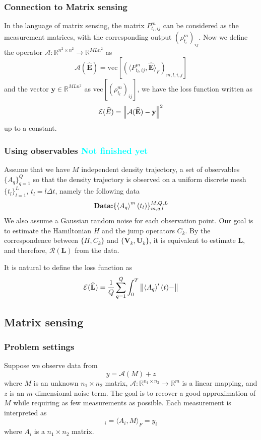\documentclass[10pt]{article}  %
\theoremstyle{plain}
\numberwithin{equation}{section}
\newcommand{\innerp}[1]{\langle{#1}\rangle}
\def\mE{\mathcal{E}}
\def\mA{\mathcal{A}}
\def\mR{\mathcal{R}}
\def\R{\mathbb{R}}
\newcommand{\bL}{\mathbf{L}}
\newcommand{\bV}{\mathbf{V}}
\newcommand{\bU}{\mathbf{U}}
\newcommand{\bE}{\mathbf{E}}
\newcommand{\by}{\mathbf{y}}
\renewcommand{\vec}{\text{vec}}
\newcommand{\QL}[1]{\textcolor{cyan}{{#1}}}
\begin{document}
\subsubsection{Connection to Matrix sensing}
In the language of matrix sensing, the matrix $P^m_{t_l, ij}$ can be considered as the measurement matrices, with the corresponding output $(\rho^m_{t_l})_{ij}$. Now we define the operator $\mA : \R^{n^2\times n^2}\to \R^{MLn^2}$ as
\begin{equation}
	\mA(\widehat{\bE}) = \vec\left[(\innerp{P^m_{t_l, ij}, \widehat{\bE}}_F)_{m, l, i, j}\right]
\end{equation}
and the vector $\by\in \R^{MLn^2}$ as $\vec\left[(\rho^m_{t_l})_{ij}\right]$, we have the loss function written as 
\begin{equation}
	\mE(\widehat{E}) = \norm{\mA(\widehat{\bE}) - \by}^2
\end{equation}
up to a constant. 

\subsubsection{Using observables \QL{Not finished yet}}
Assume that we have $M$ independent density trajectory, a set of observables $\{A_q\}_{q = 1}^Q$ so that the density trajectory is observed on a uniform discrete mesh $\{t_l\}_{l = 1}^L$, $t_l = l \Delta t$, namely the following data
\begin{equation}
	\textbf{Data:} \{\expval{A_q}^m (t_l)\}_{m, q, l}^{M, Q, L}
\end{equation}
We also assume a Gaussian random noise for each observation point. Our goal is to estimate the Hamiltonian $H$ and the jump operators $C_k$. By the correspondence between $\{H, C_k\}$ and $\{\bV_k, \bU_k\}$, it is equivalent to estimate $\bL$, and therefore, $\mR(\bL)$ from the data. 

It is natural to define the loss function as 
\begin{equation}
	\mE(\widehat{\bL}) = \frac{1}{Q}\sum_{q = 1}^Q\int_0^T \norm{\expval{A_q}'(t) - }
\end{equation}




\subsection{Matrix sensing}
\subsubsection{Problem settings}
Suppose we observe data from 
\begin{equation}
	y = \mA(M) + z
\end{equation}
where $M$ is an unknown $n_1 \times n_2$ matrix, $\mA : \R^{n_1\times n_2} \to \R^m$ is a linear mapping, and $z$ is an $m$-dimensional noise term. The goal is to recover a good approximation of $M$ while requiring as few measurements as possible. Each measurement is interpreted as 
\begin{equation}
	[\mA(M)]_i = \innerp{A_i, M}_F = y_i
\end{equation}
where $A_i$ is a $n_1\times n_2$ matrix.
\end{document}
